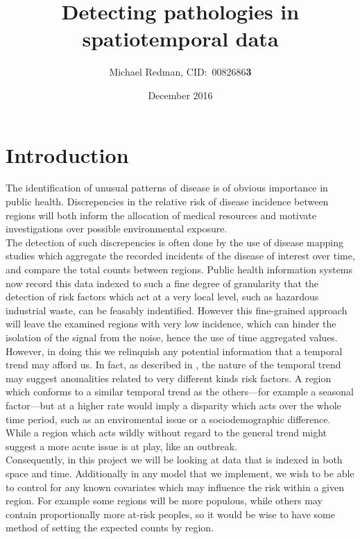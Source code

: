 \documentclass{report}
\begin{document}
\title{Detecting pathologies in spatiotemporal data}
\author{Michael Redman, CID:\ 0082686\textbf{3}}
\date{December 2016}

\maketitle

\tableofcontents

\chapter{Introduction}

The identification of unusual patterns of disease is of obvious importance in public health. Discrepencies in the relative risk of disease incidence between regions will both inform the allocation of medical resources and motivate investigations over possible environmental exposure. \\

 The detection of such discrepencies is often done by the use of disease mapping studies which aggregate the recorded incidents of the disease of interest over time, and compare the total counts between regions. Public health information systems now record this data indexed to such a fine degree of granularity that the detection of risk factors which act at a very local level, such as hazardous industrial waste, can be feasably indentified. However this fine-grained approach will leave the examined regions with very low incidence, which can hinder the isolation of the signal from the noise, hence the use of time aggregated values. However, in doing this we relinquish any potential information that a temporal trend may afford us. In fact, as described in \cite{stability}, the nature of the temporal trend may suggest anomalities related to very different kinds risk factors. A region which conforms to a similar temporal trend as the others---for example a seasonal factor---but at a higher rate would imply a disparity which acts over the whole time period, such as an enviromental issue or a sociodemographic difference. While a region which acts wildly without regard to the general trend might suggest a more acute issue is at play, like an outbreak. \\

Consequently, in this project we will be looking at data that is indexed in both space and time. Additionally in any model that we implement, we wish to be able to control for any known covariates which may influence the risk within a given region. For example some regions will be more populous, while others may contain proportionally more at-risk peoples, so it would be wise to have some method of setting the expected counts by region. \\
\end{document}
